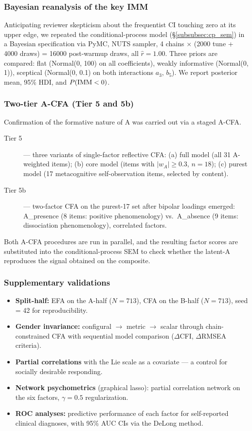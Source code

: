 \subsubsection{Bayesian reanalysis of the key IMM}

Anticipating reviewer skepticism about the frequentist CI touching zero at its upper edge, we repeated the conditional-process model (§\ref{subsubsec:cp_sem}) in a Bayesian specification via PyMC, NUTS sampler, 4 chains $\times$ (2000 tune + 4000 draws) = 16000 post-warmup draws, all $\hat{r} = 1.00$. Three priors are compared: flat (Normal(0, 100) on all coefficients), weakly informative (Normal(0, 1)), sceptical (Normal(0, 0.1) on both interactions $a_3$, $b_5$). We report posterior mean, 95\% HDI, and $P(\mathrm{IMM} < 0)$.

\subsubsection{Two-tier A-CFA (Tier 5 and 5b)}

Confirmation of the formative nature of A was carried out via a staged A-CFA.
\begin{description}
    \item[Tier 5] --- three variants of single-factor reflective CFA: (a) full model (all 31 A-weighted items); (b) core model (items with $|w_A| \geq 0.3$, $n = 18$); (c) purest model (17 metacognitive self-observation items, selected by content).
    \item[Tier 5b] --- two-factor CFA on the purest-17 set after bipolar loadings emerged: A\_presence (8 items: positive phenomenology) vs.\ A\_absence (9 items: dissociation phenomenology), correlated factors.
\end{description}
Both A-CFA procedures are run in parallel, and the resulting factor scores are substituted into the conditional-process SEM to check whether the latent-A reproduces the signal obtained on the composite.

\subsubsection{Supplementary validations}

\begin{itemize}
    \item \textbf{Split-half:} EFA on the A-half ($N = 713$), CFA on the B-half ($N = 713$), seed = 42 for reproducibility.
    \item \textbf{Gender invariance:} configural $\to$ metric $\to$ scalar through chain-constrained CFA with sequential model comparison ($\Delta$CFI, $\Delta$RMSEA criteria).
    \item \textbf{Partial correlations} with the Lie scale as a covariate --- a control for socially desirable responding.
    \item \textbf{Network psychometrics} (graphical lasso): partial correlation network on the six factors, $\gamma = 0.5$ regularization.
    \item \textbf{ROC analyses:} predictive performance of each factor for self-reported clinical diagnoses, with 95\% AUC CIs via the DeLong method.
\end{itemize}

